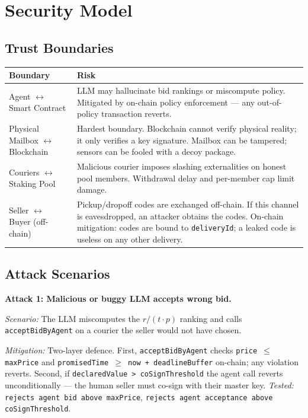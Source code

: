 \documentclass[12pt,a4paper]{article}
\begin{document}
\section{Security Model}

\subsection{Trust Boundaries}

\begin{center}
\begin{tabular}{p{4.5cm}p{9.5cm}}
\toprule
Boundary & Risk \\
\midrule
Agent $\leftrightarrow$ Smart Contract &
LLM may hallucinate bid rankings or miscompute policy. Mitigated by on-chain policy enforcement — any out-of-policy transaction reverts. \\
\addlinespace
Physical Mailbox $\leftrightarrow$ Blockchain &
Hardest boundary. Blockchain cannot verify physical reality; it only verifies a key signature. Mailbox can be tampered; sensors can be fooled with a decoy package. \\
\addlinespace
Couriers $\leftrightarrow$ Staking Pool &
Malicious courier imposes slashing externalities on honest pool members. Withdrawal delay and per-member cap limit damage. \\
\addlinespace
Seller $\leftrightarrow$ Buyer (off-chain) &
Pickup/dropoff codes are exchanged off-chain. If this channel is eavesdropped, an attacker obtains the codes. On-chain mitigation: codes are bound to \texttt{deliveryId}; a leaked code is useless on any other delivery. \\
\bottomrule
\end{tabular}
\end{center}

\subsection{Attack Scenarios}

\begin{attackbox}
\textbf{Attack 1: Malicious or buggy LLM accepts wrong bid.}

\textit{Scenario:} The LLM miscomputes the $r/(t \cdot p)$ ranking and calls \texttt{acceptBidByAgent} on a courier the seller would not have chosen.

\textit{Mitigation:} Two-layer defence. First, \texttt{acceptBidByAgent} checks \texttt{price $\leq$ maxPrice} and \texttt{promisedTime $\geq$ now + deadlineBuffer} on-chain; any violation reverts. Second, if \texttt{declaredValue > coSignThreshold} the agent call reverts unconditionally — the human seller must co-sign with their master key. \textit{Tested:} \texttt{rejects agent bid above maxPrice}, \texttt{rejects agent acceptance above coSignThreshold}.
\end{attackbox}
\end{document}
